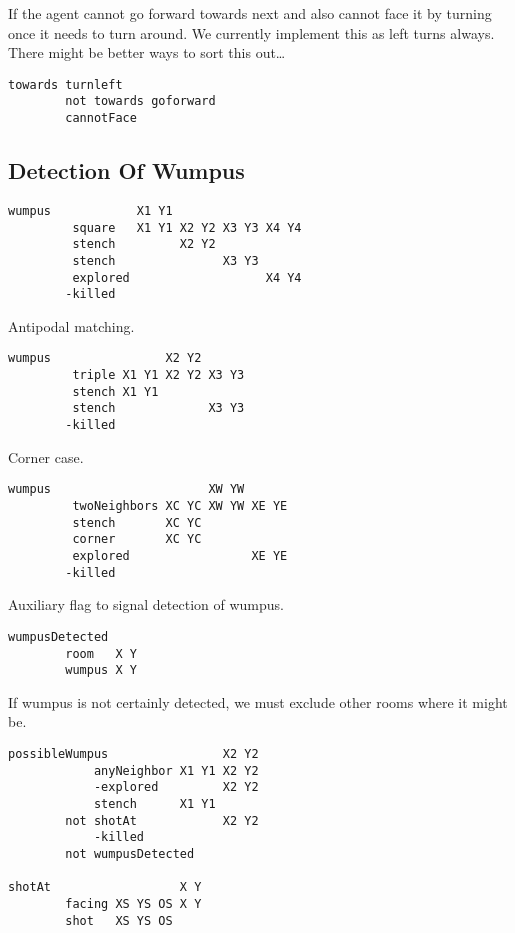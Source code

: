 If the agent cannot go forward towards next and also cannot face it by
turning once it needs to turn around. We currently implement this as
left turns always. There might be better ways to sort this out\ldots{}

\begin{verbatim}
towards turnleft
        not towards goforward
        cannotFace
\end{verbatim}

\hypertarget{detection-of-wumpus}{%
\subsection{Detection Of Wumpus}\label{detection-of-wumpus}}

\begin{verbatim}
wumpus            X1 Y1
         square   X1 Y1 X2 Y2 X3 Y3 X4 Y4
         stench         X2 Y2
         stench               X3 Y3
         explored                   X4 Y4
        -killed
\end{verbatim}

Antipodal matching.

\begin{verbatim}
wumpus                X2 Y2
         triple X1 Y1 X2 Y2 X3 Y3
         stench X1 Y1
         stench             X3 Y3
        -killed
\end{verbatim}

Corner case.

\begin{verbatim}
wumpus                      XW YW
         twoNeighbors XC YC XW YW XE YE
         stench       XC YC
         corner       XC YC
         explored                 XE YE
        -killed
\end{verbatim}

Auxiliary flag to signal detection of wumpus.

\begin{verbatim}
wumpusDetected
        room   X Y
        wumpus X Y
\end{verbatim}

If wumpus is not certainly detected, we must exclude other rooms where
it might be.

\begin{verbatim}
possibleWumpus                X2 Y2
            anyNeighbor X1 Y1 X2 Y2
            -explored         X2 Y2
            stench      X1 Y1
        not shotAt            X2 Y2
            -killed
        not wumpusDetected

shotAt                  X Y
        facing XS YS OS X Y
        shot   XS YS OS
\end{verbatim}

